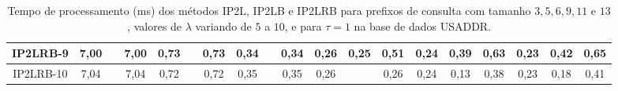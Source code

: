\begin{table}[h]
{\begin{tabular}{c|c|c|c|c|c|c|c|c|c|c|c|c|c|c|c|c|c|c|}
\multicolumn{1}{|c|}{IP2LRB-9} & {\color[HTML]{656565} 7,00} & {\color[HTML]{656565} } & 7,00 & {\color[HTML]{656565} 0,73} & {\color[HTML]{656565} } & 0,73 & {\color[HTML]{656565} 0,34} & {\color[HTML]{656565} } & 0,34 & {\color[HTML]{656565} 0,26} & {\color[HTML]{656565} 0,25} & 0,51 & {\color[HTML]{656565} 0,24} & {\color[HTML]{656565} 0,39} & 0,63 & {\color[HTML]{656565} 0,23} & {\color[HTML]{656565} 0,42} & 0,65 \\ \hline
\multicolumn{1}{|c|}{IP2LRB-10} & {\color[HTML]{656565} 7,04} & {\color[HTML]{656565} } & 7,04 & {\color[HTML]{656565} 0,72} & {\color[HTML]{656565} } & 0,72 & {\color[HTML]{656565} 0,35} & {\color[HTML]{656565} } & 0,35 & {\color[HTML]{656565} 0,26} & {\color[HTML]{656565} } & 0,26 & {\color[HTML]{656565} 0,24} & {\color[HTML]{656565} 0,13} & 0,38 & {\color[HTML]{656565} 0,23} & {\color[HTML]{656565} 0,18} & 0,41 \\ \hline
\end{tabular}%
}
\caption{Tempo de processamento (ms) dos métodos IP2L, IP2LB e IP2LRB para prefixos de consulta com tamanho $3,5,6,9,11$ e $13$, valores de $\lambda$ variando de $5$ a $10$, e para $\tau=1$ na base de dados USADDR.}
\label{tab:methods-processing-time-tau-1-USADDR}
\end{table}



